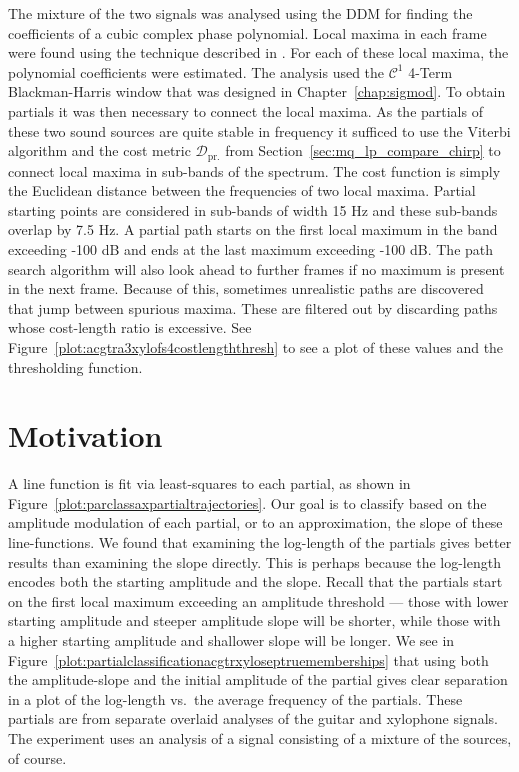 The mixture of the two signals was analysed using the DDM for finding the
coefficients of a cubic complex phase polynomial. Local maxima in each frame
were found using the technique described in \cite[p.~42]{serra1989system}. For
each of these local maxima, the polynomial coefficients were estimated. The
analysis used the $\mathcal{C}^{1}$ 4-Term Blackman-Harris window that was
designed in Chapter~\ref{chap:sigmod}. To obtain
partials it was then necessary to connect the local maxima. As the partials of
these two sound sources are quite stable in frequency it sufficed to use the
Viterbi algorithm \cite{forney1973viterbi} and the cost metric
$\mathcal{D}_{\text{pr.}}$ from Section~\ref{sec:mq_lp_compare_chirp} to connect
local maxima in sub-bands of the spectrum. The cost function is simply the
Euclidean distance between the frequencies of two local maxima. Partial starting
points are considered in sub-bands of width 15 Hz and these sub-bands overlap by
7.5 Hz. A partial path starts on the first local maximum in the band exceeding
-100 dB and ends at the last maximum exceeding -100 dB. The path search
algorithm will also look ahead to further frames if no maximum is present in the
next frame. Because of this, sometimes unrealistic paths are discovered that
jump between spurious maxima. These are filtered out by discarding paths whose
cost-length ratio is excessive. See
Figure~\ref{plot:acgtra3xylofs4costlengththresh} to see a plot of these values
and the thresholding function. 

\section{Motivation}

A line function is fit via least-squares to each partial, as shown in
Figure~\ref{plot:parclassaxpartialtrajectories}. Our goal is to classify based
on the amplitude modulation of each partial, or to an approximation, the slope of these line-functions. We found that examining the log-length of the
partials gives better results than examining the slope directly. This is perhaps
because the log-length encodes both the starting amplitude and the slope. Recall
that the partials start on the first local maximum exceeding an amplitude
threshold --- those with lower starting amplitude and steeper amplitude slope will be
shorter, while those with a higher starting amplitude and shallower slope will
be longer. We see in
Figure~\ref{plot:partialclassificationacgtrxyloseptruememberships} that using
both the amplitude-slope and the initial amplitude of the partial gives clear
separation in a plot of the log-length vs.\ the
average frequency of
the partials. These partials are from separate overlaid analyses of the guitar
and xylophone signals. The experiment uses an analysis of a signal consisting of
a mixture of the sources, of course.


